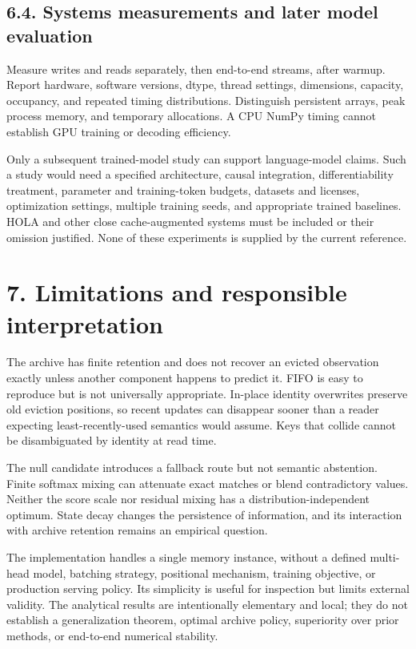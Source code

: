 \documentclass[11pt,a4paper]{article}
\begin{document}
\subsection{6.4. Systems measurements and later model evaluation}\label{systems-measurements-and-later-model-evaluation}

Measure writes and reads separately, then end-to-end streams, after warmup. Report hardware, software versions, dtype, thread settings, dimensions, capacity, occupancy, and repeated timing distributions. Distinguish persistent arrays, peak process memory, and temporary allocations. A CPU NumPy timing cannot establish GPU training or decoding efficiency.

Only a subsequent trained-model study can support language-model claims. Such a study would need a specified architecture, causal integration, differentiability treatment, parameter and training-token budgets, datasets and licenses, optimization settings, multiple training seeds, and appropriate trained baselines. HOLA and other close cache-augmented systems must be included or their omission justified. None of these experiments is supplied by the current reference.

\section{7. Limitations and responsible interpretation}\label{limitations-and-responsible-interpretation}

The archive has finite retention and does not recover an evicted observation exactly unless another component happens to predict it. FIFO is easy to reproduce but is not universally appropriate. In-place identity overwrites preserve old eviction positions, so recent updates can disappear sooner than a reader expecting least-recently-used semantics would assume. Keys that collide cannot be disambiguated by identity at read time.

The null candidate introduces a fallback route but not semantic abstention. Finite softmax mixing can attenuate exact matches or blend contradictory values. Neither the score scale nor residual mixing has a distribution-independent optimum. State decay changes the persistence of information, and its interaction with archive retention remains an empirical question.

The implementation handles a single memory instance, without a defined multi-head model, batching strategy, positional mechanism, training objective, or production serving policy. Its simplicity is useful for inspection but limits external validity. The analytical results are intentionally elementary and local; they do not establish a generalization theorem, optimal archive policy, superiority over prior methods, or end-to-end numerical stability.
\end{document}
